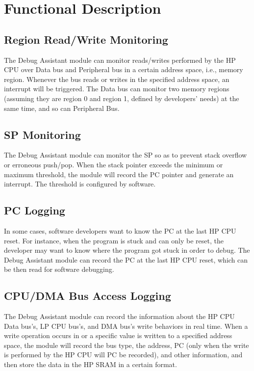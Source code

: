 \documentclass[main\_\_EN.tex]{subfiles}
\begin{document}
\section{Functional Description}
\label{sec:dbgassist-func-descr}

\subsection{Region Read/Write Monitoring}

The Debug Assistant module can monitor reads/writes performed by the HP CPU over Data bus and Peripheral bus in a certain address space, i.e., memory region. Whenever the bus reads or writes in the specified address space, an interrupt will be triggered. The Data bus can monitor two memory regions (assuming they are region 0 and region 1, defined by developers' needs) at the same time, and so can Peripheral Bus.

\subsection{SP Monitoring}

The Debug Assistant module can monitor the SP so as to prevent stack overflow or erroneous push/pop. When the stack pointer exceeds the minimum or maximum threshold, the module will record the PC pointer and generate an interrupt. The threshold is configured by software.

\subsection{PC Logging}

In some cases, software developers want to know the PC at the last HP CPU reset. For instance, when the program is stuck and can only be reset, the developer may want to know where the program got stuck in order to debug. The Debug Assistant module can record the PC at the last HP CPU reset, which can be then read for software debugging. 

\subsection{CPU/DMA Bus Access Logging}

The Debug Assistant module can record the information about the HP CPU Data bus's, LP CPU bus's, and DMA bus's write behaviors in real time. When a write operation occurs in or a specific value is written to a specified address space, the module will record the bus type, the address, PC (only when the write is performed by the HP CPU will PC be recorded), and other information, and then store the data in the HP SRAM in a certain format.
\end{document}
